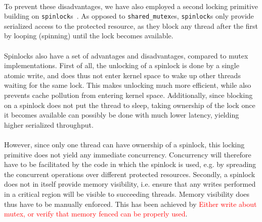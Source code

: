 \documentclass[11pt]{article} %
\begin{document}
\\
To prevent these disadvantages, we have also employed a second locking primitive building on \verb|spinlock|s~\cite{spinlock}. As opposed to \verb|shared_mutex|es, \verb|spinlock|s only provide serialized access to the protected resource, as they block any thread after the first by looping (spinning) until the lock becomes available. \\
\\
Spinlocks also have a set of advantages and disadvantages, compared to mutex implementations. First of all, the unlocking of a spinlock is done by a single atomic write, and does thus not enter kernel space to wake up other threads waiting for the same lock. This makes unlocking much more efficient, while also prevents cache pollution from entering kernel space. Additionally, since blocking on a spinlock does not put the thread to sleep, taking ownership of the lock once it becomes available can possibly be done with much lower latency, yielding higher serialized throughput. \\
\\
However, since only one thread can have ownership of a spinlock, this locking primitive does not yield any immediate concurrency. Concurrency will therefore have to be facilitated by the code in which the spinlock is used, e.g. by spreading the concurrent operations over different protected resources. Secondly, a spinlock does not in itself provide memory visibility, i.e. ensure that any writes performed in a critical region will be visible to succeeding threads. Memory visibility does thus have to be manually enforced. This has been achieved by \textcolor{red}{Either write about mutex, or verify that memory fenced can be properly used}.
\end{document}
